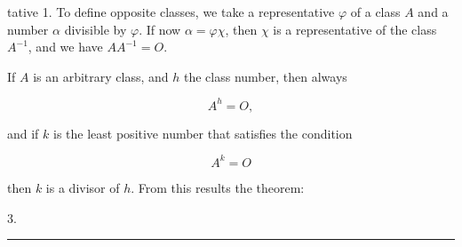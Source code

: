 tative 1. To define opposite classes, we take a representative $\varphi$ of a class $A$ and a number $\alpha$ divisible by $\varphi$. If now $\alpha = \varphi\chi$, then $\chi$ is a representative of the class $A^{-1}$, and we have $AA^{-1} = O$.

If $A$ is an arbitrary class, and $h$ the class number, then always

\[ A^h = O, \]

and if $k$ is the least positive number that satisfies the condition

\[ A^k = O \]

then $k$ is a divisor of $h$. From this results the theorem:

3.~

\begin{center}
\rule{4cm}{0.4pt}
\end{center}
